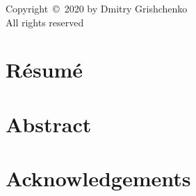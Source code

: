 \documentclass[12pt,singlespace]{mitthesis}
\begin{document}
\linenumbers

%
\newpage
\null\vfill
\begin{center}
Copyright~\copyright~2020 by Dmitry Grishchenko\\
All rights reserved
\end{center}




\newpage

\begingroup
\let\cleardoublepage\clearpage

\chapter*{R\'esum\'e}


\chapter*{Abstract}


\chapter*{Acknowledgements}


\endgroup

\clearpage
{}

% 






%     





\begin{subappendices}
    
\end{subappendices}







% 


\end{document}
